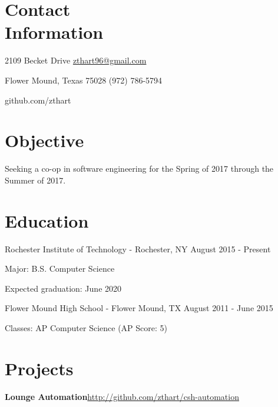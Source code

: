 \documentclass[letter,margin,line]{resume}
\newcommand{\rurl}[1]{\hfill {\footnotesize \url{#1}}}
\newcommand{\rdate}[1]{\hfill {\small #1}}
\begin{document}
\begin{resume}
\section{\mysidestyle Contact \\ Information} \vspace{2mm}
	\begin{asparablank}
		\item 2109 Becket Drive  \hfill \href{mailto:zthart96@gmail.com}{zthart96@gmail.com}
		\item Flower Mound, Texas 75028 \hfill (972) 786-5794
		\item \hfill github.com/zthart
    \end{asparablank}

\section{\mysidestyle Objective}
	\begin{asparablank}
    	\item  \small Seeking a co-op in software engineering for the Spring of 2017 through the Summer of 2017.
        \normalsize
        \\
	\end{asparablank}

\section{\mysidestyle Education}
	\begin{compactdesc}
		\item[Rochester Institute of Technology] - Rochester, NY \rdate{August 2015 - Present}
		\begin{compactitem} { \small
			\item Major: B.S. Computer Science
			\item Expected graduation: June 2020
		} \end{compactitem}
        \item[Flower Mound High School] - Flower Mound, TX \rdate{August 2011 - June 2015}
		\begin{compactitem} { \small
			\item Classes: AP Computer Science (AP Score: 5)
		} \end{compactitem}
	\end{compactdesc}

\section{\mysidestyle Projects}
	\begin{asparablank}
		\item {\bf Lounge Automation}\rurl{http://github.com/zthart/csh-automation}


\end{asparablank}
\end{resume}
\end{document}
